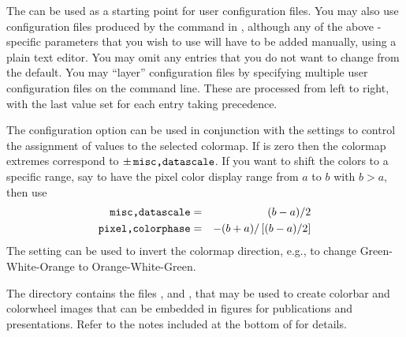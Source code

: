 The  can be used as a starting point for
user configuration files.  You may also use configuration files produced
by the  command in
, although any of the above
-specific parameters that you wish to use will have to be
added manually, using a plain text editor.  You may omit any entries
that you do not want to change from the default.  You may ``layer''
configuration files by specifying multiple user configuration files on
the command line.  These are processed from left to right, with the last
value set for each entry taking precedence.

The  configuration option can be used in conjunction
with the  settings to control the assignment of values to
the selected colormap. If  is zero then the colormap
extremes correspond to $\pm\,\texttt{misc,datascale}$.  If you want to shift
the colors to a specific range, say to have the pixel color display
range from $a$ to $b$ with $b>a$, then use
\begin{eqnarray*}
  \texttt{misc,datascale} & = & (b-a)/2 \\
  \texttt{pixel,colorphase} & = & -(b+a)/\left[(b-a)/2\right]
\end{eqnarray*}
The  setting can be used to invert the colormap
direction, e.g., to change Green-White-Orange to Orange-White-Green.

The  directory contains the
files
,  and ,
 that may be used to create colorbar and colorwheel
images that can be embedded in figures for publications and
presentations. Refer to the notes included at the bottom of
 for details.


